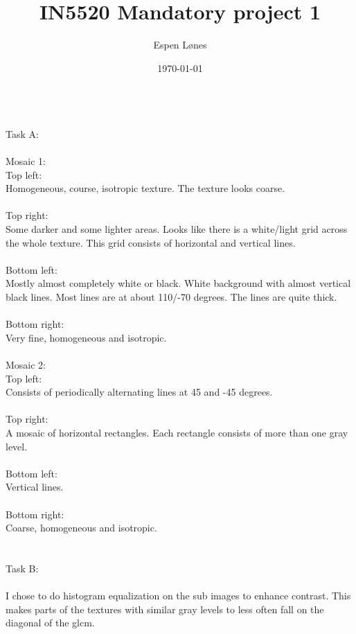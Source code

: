 \documentclass[12pt, letterpaper, twoside]{article}
\begin{document}
\title{IN5520 Mandatory project 1}
\author{Espen Lønes}
\date{\today}
\maketitle
\ \\
Task A:\\
\ \\
Mosaic 1:\\
Top left:\\
Homogeneous, course, isotropic texture. The texture looks coarse.\\
\ \\
Top right:\\
Some darker and some lighter areas. Looks like there is a white/light grid across the whole texture. This grid consists of horizontal and vertical lines.\\
\ \\ 
Bottom left:\\
Mostly almost completely white or black. White background with almost vertical black lines. Most lines are at about 110/-70 degrees. The lines are quite thick.\\
\ \\    
Bottom right:\\
Very fine, homogeneous and isotropic.\\
\newpage
\ \\
Mosaic 2:\\
Top left:\\
Consists of periodically alternating lines at 45 and -45 degrees.\\
\ \\
Top right:\\
A mosaic of horizontal rectangles. Each rectangle consists of more than one gray level.\\
\ \\
Bottom left:\\
Vertical lines.\\
\ \\
Bottom right:\\
Coarse, homogeneous and isotropic.\\
\ \\
\ \\
Task B:\\
\ \\
I chose to do histogram equalization on the sub images to enhance contrast. This makes parts of the textures with similar gray levels to less often fall on the diagonal of the glcm.\\
\end{document}
